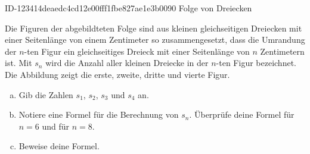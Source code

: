 \begin{exercise}
      {ID-123414deaedc4cd12e00fff1fbe827ae1e3b0090}
      {Folge von Dreiecken}
  \ifproblem\problem\par
    Die Figuren der abgebildteten Folge sind aus
    kleinen gleichseitigen Dreiecken mit einer
    Seitenlänge von einem Zentimeter so
    zusammengesetzt, dass die Umrandung der $n$-ten
    Figur ein gleichseitiges Dreieck mit einer
    Seitenlänge von $n$ Zentimetern ist. Mit
    $s_{n}$ wird die Anzahl aller kleinen Dreiecke
    in der $n$-ten Figur bezeichnet. Die Abbildung
    zeigt die erste, zweite, dritte und vierte Figur.
    \begin{center}
    \end{center}
    \begin{enumerate}[a)]
      \item Gib die Zahlen $s_{1}$, $s_{2}$, $s_{3}$
            und $s_{4}$ an.
      \item Notiere eine Formel für die Berechnung
            von $s_{n}$. Überprüfe deine Formel für
            $n=6$ und für $n=8$.
      \item Beweise deine Formel.
    \end{enumerate}
  \fi
\end{exercise}

